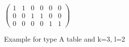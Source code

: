 \begin{figure}[H]
    \centering
    \(
    \begin{pmatrix}
        1 & 1 & 0 & 0 & 0 & 0 \\
        0 & 0 & 1 & 1 & 0 & 0 \\
        0 & 0 & 0 & 0 & 1 & 1
    \end{pmatrix}
    \)
    \caption{Example for type A table and k=3, l=2}\label{fig:graph_limit_A}
\end{figure}